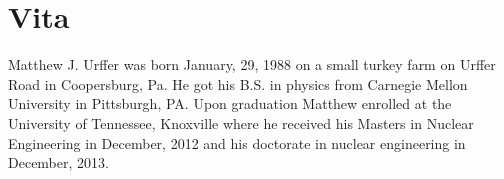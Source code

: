 \chapter*{Vita} \label{ch:vita}
Matthew J. Urffer was born January, 29, 1988 on a small turkey farm on Urffer Road in Coopersburg, Pa.
He got his B.S. in physics from Carnegie Mellon University in Pittsburgh, PA. 
Upon graduation Matthew enrolled at the University of Tennessee, Knoxville where he received his Masters in Nuclear Engineering in December, 2012 and his doctorate in nuclear engineering in December, 2013.

